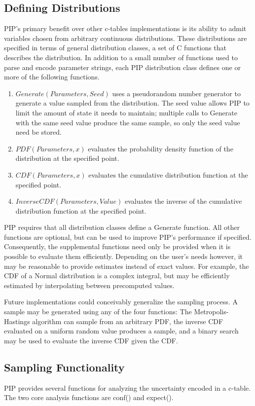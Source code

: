 \subsection{Defining Distributions}
PIP's primary benefit over other c-tables implementations is its ability to admit variables chosen from arbitrary continuous distributions.  These distributions are specified in terms of general distribution classes, a set of C functions that describes the distribution.  In addition to a small number of functions used to parse and encode parameter strings, each PIP distribution class defines one or more of the following functions.
\begin{enumerate}
\item $Generate(Parameters, Seed)$ uses a pseudorandom number generator to generate a value sampled from the distribution.  The seed value allows PIP to limit the amount of state it needs to maintain; multiple calls to Generate with the same seed value produce the same sample, so only the seed value need be stored.
\item $PDF(Parameters, x)$ evaluates the probability density function of the distribution at the specified point.  
\item $CDF(Parameters, x)$ evaluates the cumulative distribution function at the specified point.
\item $InverseCDF(Parameters, Value)$ evaluates the inverse of the cumulative distribution function at the specified point.
\end{enumerate}

PIP requires that all distribution classes define a Generate function.  All other functions are optional, but can be used to improve PIP's performance if specified.  Consequently, the supplemental functions need only be provided when it is possible to evaluate them efficiently.  Depending on the user's needs however, it may be reasonable to provide estimates instead of exact values.  For example, the CDF of a Normal distribution is a complex integral, but may be efficiently estimated by interpolating between precomputed values.  

Future implementations could conceivably generalize the sampling process.  A sample may be generated using any of the four functions: The Metropolis-Hastings algorithm can sample from an arbitrary PDF, the inverse CDF evaluated on a uniform random value produces a sample, and a binary search may be used to evaluate the inverse CDF given the CDF.

\subsection{Sampling Functionality}
PIP provides several functions for analyzing the uncertainty encoded in a c-table.  The two core analysis functions are conf() and expect().

